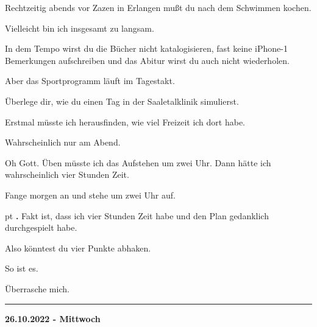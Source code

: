 \documentclass[10pt,a4paper]{article}
\newcounter{notec}
\newcommand\notep[1]{%
  \stepcounter{notec}
  \vskip #1pt
  {\bf\arabic{notec}.}
}
\newcommand\rele[1] {{\color {english} \bf {#1}}}              %
\newcommand\ddivide {\vskip -9pt \hrule \vskip 6pt}
\begin{document}
\begin{mdframed}[style=daystyle]
  \vskip 2pt
  Rechtzeitig abends vor Zazen in Erlangen mußt du nach dem Schwimmen kochen.

  \vskip 2pt
  Vielleicht bin ich insgesamt zu langsam.

  \vskip 2pt
  In dem Tempo wirst du die Bücher nicht katalogisieren, fast keine iPhone-1
  Bemerkungen aufschreiben und das Abitur wirst du auch nicht wiederholen.

  \vskip 2pt
  Aber das Sportprogramm läuft im Tagestakt.

  \vskip 2pt
  Überlege dir, wie du einen Tag in der Saaletalklinik simulierst.

  \vskip 2pt
  Erstmal müsste ich herausfinden, wie viel Freizeit ich dort habe.

  \vskip 2pt
  Wahrscheinlich nur am Abend.

  \vskip 2pt
  Oh Gott. Üben müsste ich das Aufstehen um zwei Uhr. Dann hätte ich
  wahrscheinlich vier Stunden Zeit.

  \vskip 2pt
  Fange morgen an und stehe um zwei Uhr auf.


  \notep 4 Fakt ist, dass ich vier Stunden Zeit habe und den Plan gedanklich
  durchgespielt habe.

  \vskip 2pt
  Also könntest du vier Punkte abhaken.

  \vskip 2pt
  So ist es.

  \vskip 2pt
  Überrasche mich.

\end{mdframed}


\ddivide
{\rele {26.10.2022 - Mittwoch}}
\end{document}
